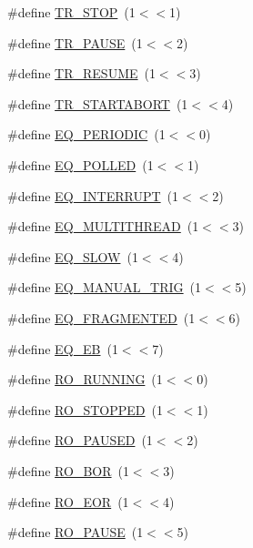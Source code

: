 \begin{DoxyCompactItemize}
\item 
\#define \hyperlink{group__mdefineh_gadd7d0605113ff6e1b4e705d31332a1a0}{TR\_\-STOP}~(1$<$$<$1)
\item 
\#define \hyperlink{group__mdefineh_ga11713399cfb35e58b8fae045836c0d88}{TR\_\-PAUSE}~(1$<$$<$2)
\item 
\#define \hyperlink{group__mdefineh_ga0b69b728877f100fe6ff76e667ff8831}{TR\_\-RESUME}~(1$<$$<$3)
\item 
\#define \hyperlink{group__mdefineh_ga61faff4d81f378438500ef8971e2b7af}{TR\_\-STARTABORT}~(1$<$$<$4)
\item 
\#define \hyperlink{group__mdefineh_ga58e919e4e401b299c1834be965c3e78c}{EQ\_\-PERIODIC}~(1$<$$<$0)
\item 
\#define \hyperlink{group__mdefineh_ga0c716a0a98b5da8bbe8477839d9b0c78}{EQ\_\-POLLED}~(1$<$$<$1)
\item 
\#define \hyperlink{group__mdefineh_gad5ba2ec0f5d55139048dbe2d416da6ba}{EQ\_\-INTERRUPT}~(1$<$$<$2)
\item 
\#define \hyperlink{group__mdefineh_ga7cc85959e8d0c4e476cf659c2cee7a33}{EQ\_\-MULTITHREAD}~(1$<$$<$3)
\item 
\#define \hyperlink{group__mdefineh_gafffdc5135b2e8f3c6bc61b8701084df6}{EQ\_\-SLOW}~(1$<$$<$4)
\item 
\#define \hyperlink{group__mdefineh_gac73e1045dff2b724325100af2e946717}{EQ\_\-MANUAL\_\-TRIG}~(1$<$$<$5)
\item 
\#define \hyperlink{group__mdefineh_ga702ba5dcc4b9f1ccf9a1a37bad62266e}{EQ\_\-FRAGMENTED}~(1$<$$<$6)
\item 
\#define \hyperlink{group__mdefineh_ga28055cb167765a3f23ac9ef55afb8e26}{EQ\_\-EB}~(1$<$$<$7)
\item 
\#define \hyperlink{group__mdefineh_gafc5ef41cae398b8500f9c3a42cef6d2c}{RO\_\-RUNNING}~(1$<$$<$0)
\item 
\#define \hyperlink{group__mdefineh_ga05a5abc619ab24e168695befc7c0b4be}{RO\_\-STOPPED}~(1$<$$<$1)
\item 
\#define \hyperlink{group__mdefineh_ga8a47b3b86a72a7db84a582277d4b7a39}{RO\_\-PAUSED}~(1$<$$<$2)
\item 
\#define \hyperlink{group__mdefineh_ga88e94e1aadd86417c8eaa304d8c3b467}{RO\_\-BOR}~(1$<$$<$3)
\item 
\#define \hyperlink{group__mdefineh_ga5b505930aa1fc780118b4fc75f771464}{RO\_\-EOR}~(1$<$$<$4)
\item 
\#define \hyperlink{group__mdefineh_ga55beb931c834300fea83d24014f235d8}{RO\_\-PAUSE}~(1$<$$<$5)

\end{DoxyCompactItemize}
